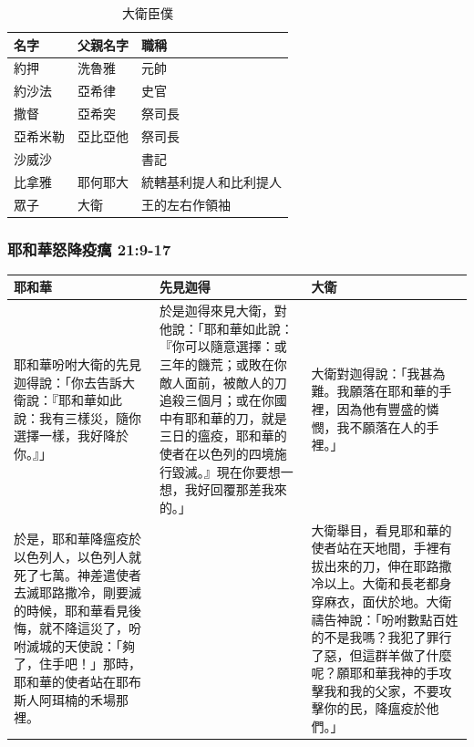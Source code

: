 \begin{table}[!hbp]
\centering
\begin{tabular}{|p{2cm}|p{1.5cm}|p{5cm}||}\hline\hline
名字   &父親名字  &職稱   \\\hline\hline
約押& 洗魯雅 &元帥 \\\hline 
約沙法  &亞希律&史官  \\\hline
撒督&亞希突&祭司長  \\\hline
亞希米勒&亞比亞他&祭司長   \\\hline
沙威沙&  &  書記  \\\hline
比拿雅&耶何耶大  & 統轄基利提人和比利提人 \\\hline
眾子&大衛  & 王的左右作領袖 \\\hline
\end{tabular}
\caption{大衛臣僕}
\end{table}


\subsubsection{耶和華怒降疫癘 21:9-17}
\begin{table}[H]
\centering
\begin{tabular}{p{5cm}|p{}|p{6.25cm}}\hline\hline
耶和華 &先見迦得  &大衛   \\\hline\hline
耶和華吩咐大衛的先見迦得說：「你去告訴大衛說：『耶和華如此說：我有三樣災，隨你選擇一樣，我好降於你。』」&於是迦得來見大衛，對他說：「耶和華如此說：『你可以隨意選擇：或三年的饑荒；或敗在你敵人面前，被敵人的刀追殺三個月；或在你國中有耶和華的刀，就是三日的瘟疫，耶和華的使者在以色列的四境施行毀滅。』現在你要想一想，我好回覆那差我來的。」&大衛對迦得說：「我甚為難。我願落在耶和華的手裡，因為他有豐盛的憐憫，我不願落在人的手裡。」\\\hline 
於是，耶和華降瘟疫於以色列人，以色列人就死了七萬。神差遣使者去滅耶路撒冷，剛要滅的時候，耶和華看見後悔，就不降這災了，吩咐滅城的天使說：「夠了，住手吧！」那時，耶和華的使者站在耶布斯人阿珥楠的禾場那裡。&  &大衛舉目，看見耶和華的使者站在天地間，手裡有拔出來的刀，伸在耶路撒冷以上。大衛和長老都身穿麻衣，面伏於地。大衛禱告神說：「吩咐數點百姓的不是我嗎？我犯了罪行了惡，但這群羊做了什麼呢？願耶和華我神的手攻擊我和我的父家，不要攻擊你的民，降瘟疫於他們。」\\\hline
\end{tabular}
\end{table}

